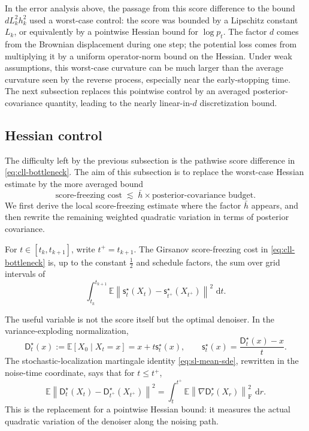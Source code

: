 \documentclass{amsart}
\numberwithin{equation}{section}
\theoremstyle{plain}
\theoremstyle{definition}
\theoremstyle{remark}
\newcommand{\E}{\mathbb{E}}
\newcommand{\dd}{\,\mathrm{d}}
\newcommand{\norm}[1]{\left\lVert #1 \right\rVert}
\newcommand{\sstar}{\mathsf{s}^{\star}}
\newcommand{\dstar}{\mathsf{D}^{\star}}
\begin{document}
In the error analysis above, the passage from this score difference to the bound
$dL_k^2h_k^2$ used a worst-case control: the score was bounded by a Lipschitz
constant $L_k$, or equivalently by a pointwise Hessian bound for $\log p_t$.
The factor $d$ comes from the Brownian displacement during one step; the
potential loss comes from multiplying it by a uniform operator-norm bound on
the Hessian.  Under weak assumptions, this worst-case curvature can be much
larger than the average curvature seen by the reverse process, especially near
the early-stopping time.  The next subsection replaces this pointwise control
by an averaged posterior-covariance quantity, leading to the
nearly linear-in-$d$ discretization bound.

\subsection{Hessian control}
\label{subsec:denoiser-D-delta-T}

The difficulty left by the previous subsection is the pathwise score difference
in \eqref{eq:cll-bottleneck}.  The aim of this subsection is to replace the
worst-case Hessian estimate by the more averaged bound
\[
    \text{score-freezing cost}
    \;\lesssim\;
    \bar h
    \times
    \text{posterior-covariance budget}.
\]
We first derive the local score-freezing estimate where the factor $\bar h$
appears, and then rewrite the remaining weighted quadratic variation in terms
of posterior covariance.

For $t\in[t_k,t_{k+1}]$, write $t^+=t_{k+1}$.  The Girsanov
score-freezing cost in \eqref{eq:cll-bottleneck} is, up to the constant
$\frac12$ and schedule factors, the sum over grid intervals of
\[
    \int_{t_k}^{t_{k+1}}
    \E\norm{
        \sstar_t(X_t)-\sstar_{t^+}(X_{t^+})
    }^2\,\dd t.
\]

The useful variable is not the score itself but the optimal denoiser.  In the
variance-exploding normalization,
\[
    \dstar_t(x):=\E[X_0\mid X_t=x]=x+t\sstar_t(x),
    \qquad
    \sstar_t(x)=\frac{\dstar_t(x)-x}{t}.
\]
The stochastic-localization martingale identity
\eqref{eq:sl-mean-sde}, rewritten in the noise-time coordinate, says that for
$t\leq t^+$,
\[
    \E\norm{
    \dstar_t(X_t)-\dstar_{t^+}(X_{t^+})
    }^2
    =
    \int_t^{t^+}
    \E\norm{\nabla \dstar_r(X_r)}_{\mathrm F}^2\,\dd r.
\]
This is the replacement for a pointwise Hessian bound: it measures the actual
quadratic variation of the denoiser along the noising path.
\end{document}
